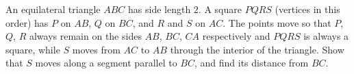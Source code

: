An equilateral triangle $ABC$ has side length $2$. A square $PQRS$ (vertices in this order) has $P$ on $AB$, $Q$ on $BC$, and $R$ and $S$ on $AC$. The points move so that $P$, $Q$, $R$ always remain on the sides $AB$, $BC$, $CA$ respectively and $PQRS$ is always a square, while $S$ moves from $AC$ to $AB$ through the interior of the triangle. Show that $S$ moves along a segment parallel to $BC$, and find its distance from $BC$.
